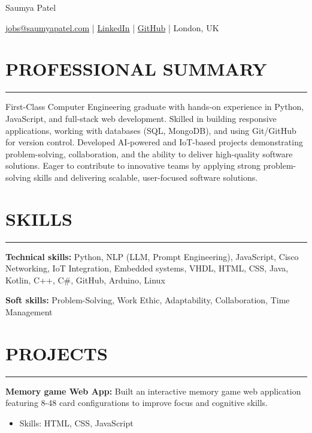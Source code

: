 \documentclass[11pt, letterpaper]{article} %
\newcommand{\resumesection}[1]{%
    \section*{#1}
    \vspace{-8pt}
    \noindent\rule{\textwidth}{0.6pt}
    \vspace{1pt}
    \noindent
}
\begin{document}
\begin{center}
{\fontsize{28}{32}\selectfont Saumya Patel}
\end{center}


\begin{center}
\href{mailto:jobs@saumyapatel.com}{jobs@saumyapatel.com} \quad | \quad \href{https://linkedin.com/in/contact-saumya-patel}{LinkedIn} \quad | \quad \href{https://github.com/Sam6219}{GitHub} \quad | \quad London, UK
\end{center}

\vspace{2pt}

\resumesection{PROFESSIONAL SUMMARY}First-Class Computer Engineering graduate with hands-on experience in Python, JavaScript, and full-stack web development. Skilled in building responsive applications, working with databases (SQL, MongoDB), and using Git/GitHub for version control. Developed AI-powered and IoT-based projects demonstrating problem-solving, collaboration, and the ability to deliver high-quality software solutions. Eager to contribute to innovative teams by applying strong problem-solving skills and delivering scalable, user-focused software solutions.

\vspace{6pt}

\resumesection{SKILLS}\textbf{Technical skills:} Python, NLP (LLM, Prompt Engineering), JavaScript, Cisco Networking, IoT Integration, Embedded systems, VHDL, HTML, CSS, Java, Kotlin, C++, C\#, GitHub, Arduino, Linux

\vspace{6pt}

\noindent\textbf{Soft skills:} Problem-Solving, Work Ethic, Adaptability, Collaboration, Time Management

\vspace{6pt}

\resumesection{PROJECTS}\textbf{Memory game Web App:} Built an interactive memory game web application featuring 8-48 card configurations to improve focus and cognitive skills.
\begin{itemize}
    \item Skills: HTML, CSS, JavaScript
\end{itemize}
\end{document}
